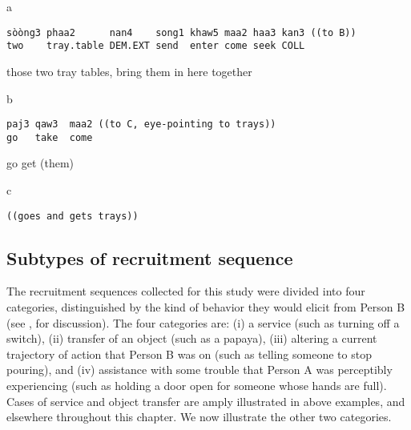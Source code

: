 \documentclass[output=paper]{langsci/langscibook}
\begin{document}
\vspace{-1mm}
%
\begin{mdframednoverticalspace}[style=firstfoc]
\begin{transbox}{1}{a}
\begin{verbatim}
sòòng3 phaa2      nan4    song1 khaw5 maa2 haa3 kan3 ((to B))
two    tray.table DEM.EXT send  enter come seek COLL
\end{verbatim}
those two tray tables, bring them in here together
\end{transbox}
\end{mdframednoverticalspace}
%
\begin{mdframednoverticalspace}[style=firstfoc]
\begin{transbox}{2}{b}
\begin{verbatim}
paj3 qaw3  maa2 ((to C, eye-pointing to trays))
go   take  come
\end{verbatim}
go get (them)
\end{transbox}
\end{mdframednoverticalspace}
%
\begin{mdframednoverticalspace}[style=secondfoc]
\begin{transbox}{3}{c}
\begin{verbatim}
((goes and gets trays))
\end{verbatim}
\end{transbox}
\end{mdframednoverticalspace}

\subsection{Subtypes of recruitment sequence}\label{sec:enfield:3.3}

The recruitment sequences collected for this study were divided into four categories, distinguished by the kind of behavior they would elicit from Person B (see ,  for discussion). The four categories are: (i) a service (such as turning off a switch), (ii) transfer of an object (such as a papaya), (iii) altering a current trajectory of action that Person B was on (such as telling someone to stop pouring), and (iv) assistance with some trouble that Person A was perceptibly experiencing (such as holding a door open for someone whose hands are full). Cases of service and object transfer are amply illustrated in above examples, and elsewhere throughout this chapter. We now illustrate the other two categories.
\end{document}
